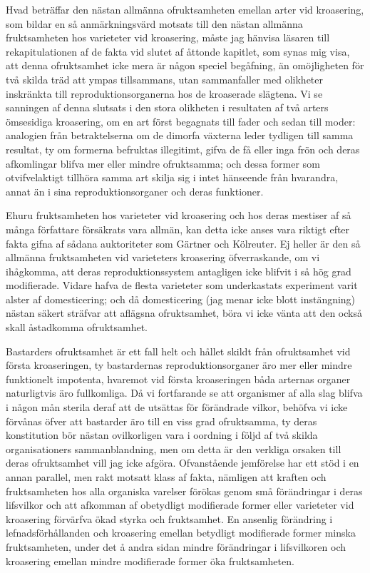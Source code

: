 Hvad beträffar den nästan allmänna ofruktsamheten emellan arter vid kroasering, som bildar en så anmärkningsvärd motsats till den nästan allmänna fruktsamheten hos varieteter vid kroasering, måste jag hänvisa läsaren till rekapitulationen af de fakta vid slutet af åttonde kapitlet, som synas mig visa, att denna ofruktsamhet icke mera är någon speciel begåfning, än omöjligheten för två skilda träd att ympas tillsammans, utan sammanfaller med olikheter inskränkta till reproduktionsorganerna hos de kroaserade slägtena. Vi se sanningen af denna slutsats i den stora olikheten i resultaten af två arters ömsesidiga kroasering, om en art först begagnats till fader och sedan till moder: analogien från betraktelserna om de dimorfa växterna leder tydligen till samma resultat, ty om formerna befruktas illegitimt, gifva de få eller inga frön och deras afkomlingar blifva mer eller mindre ofruktsamma; och dessa former som otvifvelaktigt tillhöra samma art skilja sig i intet hänseende från hvarandra, annat än i sina reproduktionsorganer och deras funktioner.

Ehuru fruktsamheten hos varieteter vid kroasering och hos deras mestiser af så många författare försäkrats vara allmän, kan detta icke anses vara riktigt efter fakta gifna af sådana auktoriteter som Gärtner och Kölreuter. Ej heller är den så allmänna fruktsamheten vid varieteters kroasering öfverraskande, om vi ihågkomma, att deras reproduktionssystem antagligen icke blifvit i så hög grad modifierade. Vidare hafva de flesta varieteter som underkastats experiment varit alster af domesticering; och då domesticering (jag menar icke blott instängning) nästan säkert sträfvar att aflägsna ofruktsamhet, böra vi icke vänta att den också skall åstadkomma ofruktsamhet.

Bastarders ofruktsamhet är ett fall helt och hållet skildt från ofruktsamhet vid första kroaseringen, ty bastardernas reproduktionsorganer äro mer eller mindre funktionelt impotenta, hvaremot vid första kroaseringen båda arternas organer naturligtvis äro fullkomliga. Då vi fortfarande se att organismer af alla slag blifva i någon mån sterila deraf att de utsättas för förändrade vilkor, behöfva vi icke förvånas öfver att bastarder äro till en viss grad ofruktsamma, ty deras konstitution bör nästan ovilkorligen vara i oordning i följd af två skilda organisationers sammanblandning, men om detta är den verkliga orsaken till deras ofruktsamhet vill jag icke afgöra. Ofvanstående jemförelse har ett stöd i en annan parallel, men rakt motsatt klass af fakta, nämligen att kraften och fruktsamheten hos alla organiska varelser förökas genom små förändringar i deras lifsvilkor och att afkomman af obetydligt modifierade former eller varieteter vid kroasering förvärfva ökad styrka och fruktsamhet. En ansenlig förändring i lefnadsförhållanden och kroasering emellan betydligt modifierade former minska fruktsamheten, under det å andra sidan mindre förändringar i lifsvilkoren och kroasering emellan mindre modifierade former öka fruktsamheten.

